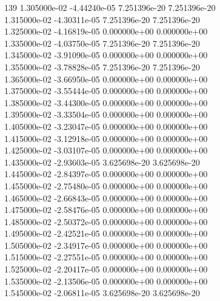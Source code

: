 139	1.305000e-02	-4.44240e-05	7.251396e-20	7.251396e-20	\\ 	1.315000e-02	-4.30311e-05	7.251396e-20	7.251396e-20	\\ 	1.325000e-02	-4.16819e-05	0.000000e+00	0.000000e+00	\\ 	1.335000e-02	-4.03750e-05	7.251396e-20	7.251396e-20	\\ 	1.345000e-02	-3.91090e-05	0.000000e+00	0.000000e+00	\\ 	1.355000e-02	-3.78828e-05	7.251396e-20	7.251396e-20	\\ 	1.365000e-02	-3.66950e-05	0.000000e+00	0.000000e+00	\\ 	1.375000e-02	-3.55444e-05	0.000000e+00	0.000000e+00	\\ 	1.385000e-02	-3.44300e-05	0.000000e+00	0.000000e+00	\\ 	1.395000e-02	-3.33504e-05	0.000000e+00	0.000000e+00	\\ 	1.405000e-02	-3.23047e-05	0.000000e+00	0.000000e+00	\\ 	1.415000e-02	-3.12918e-05	0.000000e+00	0.000000e+00	\\ 	1.425000e-02	-3.03107e-05	0.000000e+00	0.000000e+00	\\ 	1.435000e-02	-2.93603e-05	3.625698e-20	3.625698e-20	\\ 	1.445000e-02	-2.84397e-05	0.000000e+00	0.000000e+00	\\ 	1.455000e-02	-2.75480e-05	0.000000e+00	0.000000e+00	\\ 	1.465000e-02	-2.66843e-05	0.000000e+00	0.000000e+00	\\ 	1.475000e-02	-2.58476e-05	0.000000e+00	0.000000e+00	\\ 	1.485000e-02	-2.50372e-05	0.000000e+00	0.000000e+00	\\ 	1.495000e-02	-2.42521e-05	0.000000e+00	0.000000e+00	\\ 	1.505000e-02	-2.34917e-05	0.000000e+00	0.000000e+00	\\ 	1.515000e-02	-2.27551e-05	0.000000e+00	0.000000e+00	\\ 	1.525000e-02	-2.20417e-05	0.000000e+00	0.000000e+00	\\ 	1.535000e-02	-2.13506e-05	0.000000e+00	0.000000e+00	\\ 	1.545000e-02	-2.06811e-05	3.625698e-20	3.625698e-20	\\ \hline
